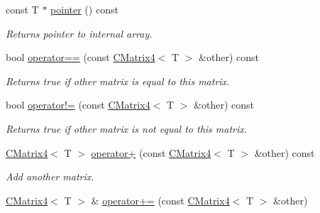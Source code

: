 \begin{DoxyCompactItemize}
const T $\ast$ \hyperlink{classirr_1_1core_1_1CMatrix4_a4d258434b1baa3a52f1ae35903ca97f9}{pointer} () const
\begin{DoxyCompactList}\small\item\em Returns pointer to internal array. \end{DoxyCompactList}\item 
\mbox{\label{classirr_1_1core_1_1CMatrix4_abcff3ee7f4d4e1c9ff23193ca0827d16}} 
bool \hyperlink{classirr_1_1core_1_1CMatrix4_abcff3ee7f4d4e1c9ff23193ca0827d16}{operator==} (const \hyperlink{classirr_1_1core_1_1CMatrix4}{C\+Matrix4}$<$ T $>$ \&other) const
\begin{DoxyCompactList}\small\item\em Returns true if other matrix is equal to this matrix. \end{DoxyCompactList}\item 
\mbox{\label{classirr_1_1core_1_1CMatrix4_a58b6bf4873a479ad15e809706e02e2cf}} 
bool \hyperlink{classirr_1_1core_1_1CMatrix4_a58b6bf4873a479ad15e809706e02e2cf}{operator!=} (const \hyperlink{classirr_1_1core_1_1CMatrix4}{C\+Matrix4}$<$ T $>$ \&other) const
\begin{DoxyCompactList}\small\item\em Returns true if other matrix is not equal to this matrix. \end{DoxyCompactList}\item 
\mbox{\label{classirr_1_1core_1_1CMatrix4_ac4a10f2ddd8a29cb9476eea061f33616}} 
\hyperlink{classirr_1_1core_1_1CMatrix4}{C\+Matrix4}$<$ T $>$ \hyperlink{classirr_1_1core_1_1CMatrix4_ac4a10f2ddd8a29cb9476eea061f33616}{operator+} (const \hyperlink{classirr_1_1core_1_1CMatrix4}{C\+Matrix4}$<$ T $>$ \&other) const
\begin{DoxyCompactList}\small\item\em Add another matrix. \end{DoxyCompactList}\item 
\mbox{\label{classirr_1_1core_1_1CMatrix4_af91c5be0562ce4be3f8feedd3d017ba1}} 
\hyperlink{classirr_1_1core_1_1CMatrix4}{C\+Matrix4}$<$ T $>$ \& \hyperlink{classirr_1_1core_1_1CMatrix4_af91c5be0562ce4be3f8feedd3d017ba1}{operator+=} (const \hyperlink{classirr_1_1core_1_1CMatrix4}{C\+Matrix4}$<$ T $>$ \&other)

\end{DoxyCompactItemize}
